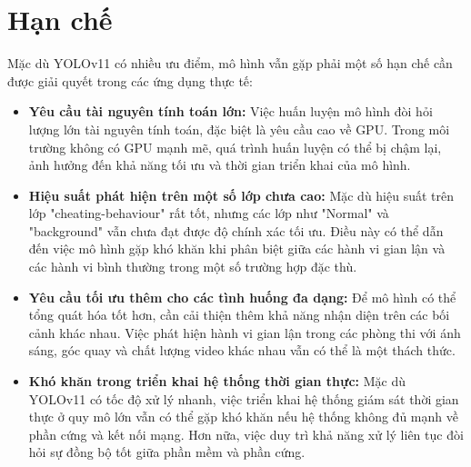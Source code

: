 \documentclass[conference]{IEEEtran}
\begin{document}
\section{Hạn chế}

Mặc dù YOLOv11 có nhiều ưu điểm, mô hình vẫn gặp phải một số hạn chế cần được giải quyết trong các ứng dụng thực tế:

\begin{itemize}
    \item \textbf{Yêu cầu tài nguyên tính toán lớn:} Việc huấn luyện mô hình đòi hỏi lượng lớn tài nguyên tính toán, đặc biệt là yêu cầu cao về GPU. Trong môi trường không có GPU mạnh mẽ, quá trình huấn luyện có thể bị chậm lại, ảnh hưởng đến khả năng tối ưu và thời gian triển khai của mô hình.
    
    \item \textbf{Hiệu suất phát hiện trên một số lớp chưa cao:} Mặc dù hiệu suất trên lớp "cheating-behaviour" rất tốt, nhưng các lớp như "Normal" và "background" vẫn chưa đạt được độ chính xác tối ưu. Điều này có thể dẫn đến việc mô hình gặp khó khăn khi phân biệt giữa các hành vi gian lận và các hành vi bình thường trong một số trường hợp đặc thù.
    
    \item \textbf{Yêu cầu tối ưu thêm cho các tình huống đa dạng:} Để mô hình có thể tổng quát hóa tốt hơn, cần cải thiện thêm khả năng nhận diện trên các bối cảnh khác nhau. Việc phát hiện hành vi gian lận trong các phòng thi với ánh sáng, góc quay và chất lượng video khác nhau vẫn có thể là một thách thức.
    
    \item \textbf{Khó khăn trong triển khai hệ thống thời gian thực:} Mặc dù YOLOv11 có tốc độ xử lý nhanh, việc triển khai hệ thống giám sát thời gian thực ở quy mô lớn vẫn có thể gặp khó khăn nếu hệ thống không đủ mạnh về phần cứng và kết nối mạng. Hơn nữa, việc duy trì khả năng xử lý liên tục đòi hỏi sự đồng bộ tốt giữa phần mềm và phần cứng.
\end{itemize}



\end{document}

